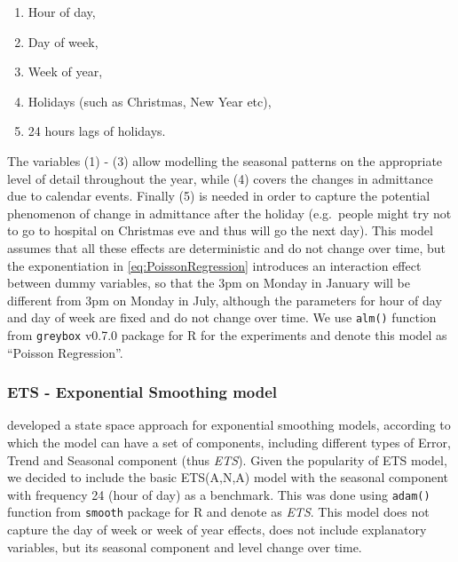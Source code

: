 \documentclass[]{elsarticle} %
\providecommand{\tightlist}{%
  \setlength{\itemsep}{0pt}\setlength{\parskip}{0pt}}
\begin{document}
\begin{enumerate}
\def\labelenumi{\arabic{enumi}.}
\tightlist
\item
  Hour of day,
\item
  Day of week,
\item
  Week of year,
\item
  Holidays (such as Christmas, New Year etc),
\item
  24 hours lags of holidays.
\end{enumerate}

The variables (1) - (3) allow modelling the seasonal patterns on the appropriate level of detail throughout the year, while (4) covers the changes in admittance due to calendar events. Finally (5) is needed in order to capture the potential phenomenon of change in admittance after the holiday (e.g.~people might try not to go to hospital on Christmas eve and thus will go the next day). This model assumes that all these effects are deterministic and do not change over time, but the exponentiation in \eqref{eq:PoissonRegression} introduces an interaction effect between dummy variables, so that the 3pm on Monday in January will be different from 3pm on Monday in July, although the parameters for hour of day and day of week are fixed and do not change over time. We use \texttt{alm()} function from \texttt{greybox} v0.7.0 package \citep{Svetunkov2021Greybox} for R \citep{RTeam2021} for the experiments and denote this model as ``Poisson Regression''.

\hypertarget{ets---exponential-smoothing-model}{%
\subsubsection{ETS - Exponential Smoothing model}\label{ets---exponential-smoothing-model}}

\citet{Hyndman2008b} developed a state space approach for exponential smoothing models, according to which the model can have a set of components, including different types of Error, Trend and Seasonal component (thus \emph{ETS}). Given the popularity of ETS model, we decided to include the basic ETS(A,N,A) model with the seasonal component with frequency 24 (hour of day) as a benchmark. This was done using \texttt{adam()} function from \texttt{smooth} package \citep{Svetunkov2021Smooth} for R and denote as \emph{ETS}. This model does not capture the day of week or week of year effects, does not include explanatory variables, but its seasonal component and level change over time.
\end{document}
